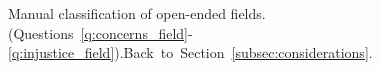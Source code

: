 \begin{figure}[h!]
    \caption[Manual classification of open-ended fields]{Manual classification of open-ended fields. (Questions~\ref{q:concerns_field}-\ref{q:injustice_field}).\hfill Back~to~Section~\ref{subsec:considerations}.
    }\label{fig:field_manual}
\end{figure}

